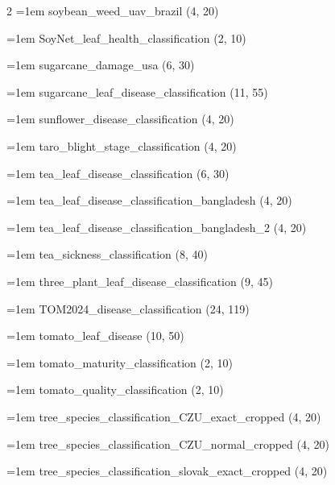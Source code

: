 \begin{multicols}{2}
\hangindent=1em soybean\_\allowbreak{}weed\_\allowbreak{}uav\_\allowbreak{}brazil (4, 20)\par
\hangindent=1em SoyNet\_\allowbreak{}leaf\_\allowbreak{}health\_\allowbreak{}classification (2, 10)\par
\hangindent=1em sugarcane\_\allowbreak{}damage\_\allowbreak{}usa (6, 30)\par
\hangindent=1em sugarcane\_\allowbreak{}leaf\_\allowbreak{}disease\_\allowbreak{}classification (11, 55)\par
\hangindent=1em sunflower\_\allowbreak{}disease\_\allowbreak{}classification (4, 20)\par
\hangindent=1em taro\_\allowbreak{}blight\_\allowbreak{}stage\_\allowbreak{}classification (4, 20)\par
\hangindent=1em tea\_\allowbreak{}leaf\_\allowbreak{}disease\_\allowbreak{}classification (6, 30)\par
\hangindent=1em tea\_\allowbreak{}leaf\_\allowbreak{}disease\_\allowbreak{}classification\_\allowbreak{}bangladesh (4, 20)\par
\hangindent=1em tea\_\allowbreak{}leaf\_\allowbreak{}disease\_\allowbreak{}classification\_\allowbreak{}bangladesh\_\allowbreak{}2 (4, 20)\par
\hangindent=1em tea\_\allowbreak{}sickness\_\allowbreak{}classification (8, 40)\par
\hangindent=1em three\_\allowbreak{}plant\_\allowbreak{}leaf\_\allowbreak{}disease\_\allowbreak{}classification (9, 45)\par
\hangindent=1em TOM2024\_\allowbreak{}disease\_\allowbreak{}classification (24, 119)\par
\hangindent=1em tomato\_\allowbreak{}leaf\_\allowbreak{}disease (10, 50)\par
\hangindent=1em tomato\_\allowbreak{}maturity\_\allowbreak{}classification (2, 10)\par
\hangindent=1em tomato\_\allowbreak{}quality\_\allowbreak{}classification (2, 10)\par
\hangindent=1em tree\_\allowbreak{}species\_\allowbreak{}classification\_\allowbreak{}CZU\_\allowbreak{}exact\_\allowbreak{}cropped (4, 20)\par
\hangindent=1em tree\_\allowbreak{}species\_\allowbreak{}classification\_\allowbreak{}CZU\_\allowbreak{}normal\_\allowbreak{}cropped (4, 20)\par
\hangindent=1em tree\_\allowbreak{}species\_\allowbreak{}classification\_\allowbreak{}slovak\_\allowbreak{}exact\_\allowbreak{}cropped (4, 20)\par

\end{multicols}
